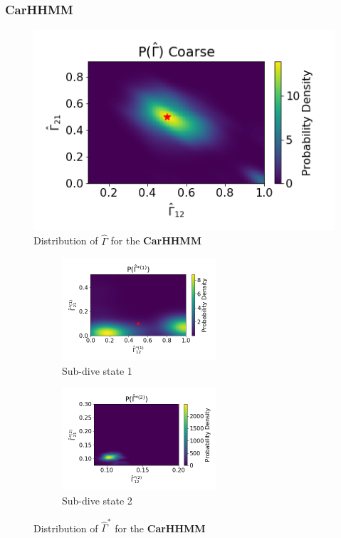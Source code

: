 \documentclass[12pt]{TD-CJS}
\begin{document}

\subsubsection{CarHHMM}

\begin{figure}
    \centering
    \includegraphics[width=5in]{../Plots/hhmm_V_Gamma_density_-1.png}
    \caption{Distribution of $\hat \Gamma$ for the \textbf{CarHHMM}}
\end{figure}

\begin{figure}[ht]
	\centering
	\begin{subfigure}[t]{0.45\textwidth}
        \centering
        \includegraphics[width=2.25in]{../Plots/hhmm_V_Gamma_density_0.png}
        \caption{Sub-dive state 1}
    \end{subfigure}
    \begin{subfigure}[t]{0.45\textwidth}
        \centering
        \includegraphics[width=2.25in]{../Plots/hhmm_V_Gamma_density_1.png}
        \caption{Sub-dive state 2}
    \end{subfigure}
    \caption{Distribution of $\hat \Gamma^{*}$ for the \textbf{CarHHMM}}
\end{figure}
\end{document}
